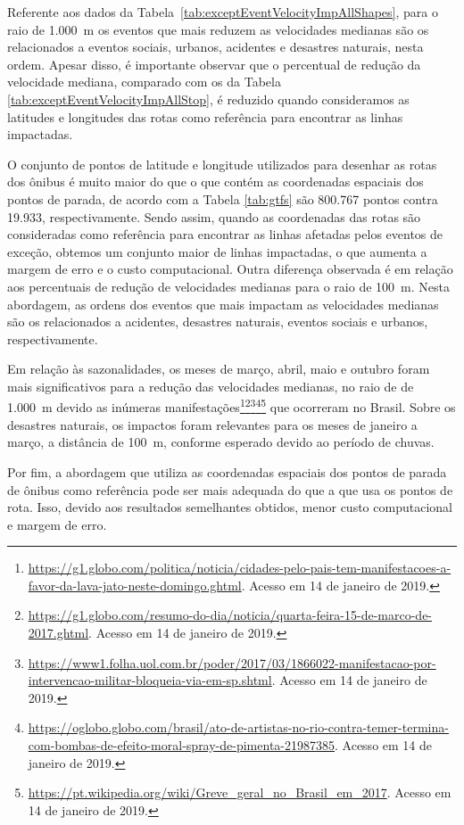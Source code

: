 \documentclass[
	12pt,				%
	oneside,			%
	a4paper,			%
	english,			%
	brazil				%
	]{abntex2ppgsi}
\begin{document}
{{{Referente aos dados da Tabela~\ref{tab:exceptEventVelocityImpAllShapes}, para o raio de 1.000~m os eventos que mais reduzem as velocidades medianas são os relacionados a eventos sociais, urbanos, acidentes e desastres naturais, nesta ordem. Apesar disso, é importante observar que o percentual de redução da velocidade mediana, comparado com os da Tabela \ref{tab:exceptEventVelocityImpAllStop}, é reduzido quando consideramos as latitudes e longitudes das rotas como referência para encontrar as linhas impactadas. 

O conjunto de pontos de latitude e longitude utilizados para desenhar as rotas dos ônibus é muito maior do que o que contém as coordenadas espaciais dos pontos de parada, de acordo com a Tabela \ref{tab:gtfs} são 800.767 pontos contra 19.933, respectivamente. Sendo assim, quando as coordenadas das rotas são consideradas como referência para encontrar as linhas afetadas pelos eventos de exceção, obtemos um conjunto maior de linhas impactadas, o que aumenta a margem de erro e o custo computacional. Outra diferença observada é em relação aos percentuais de redução de velocidades medianas para o raio de 100~m. Nesta abordagem, as ordens dos eventos que mais impactam as velocidades medianas são os relacionados a acidentes, desastres naturais, eventos sociais e urbanos, respectivamente.

Em relação às sazonalidades, os meses de  março, abril, maio e outubro foram mais significativos para a redução das velocidades medianas, no raio de de 1.000~m devido as inúmeras manifestações\footnote{\url{https://g1.globo.com/politica/noticia/cidades-pelo-pais-tem-manifestacoes-a-favor-da-lava-jato-neste-domingo.ghtml}. Acesso em 14 de janeiro de 2019.}\footnote{\url{https://g1.globo.com/resumo-do-dia/noticia/quarta-feira-15-de-marco-de-2017.ghtml}. Acesso em 14 de janeiro de 2019.}\footnote{\url{https://www1.folha.uol.com.br/poder/2017/03/1866022-manifestacao-por-intervencao-militar-bloqueia-via-em-sp.shtml}. Acesso em 14 de janeiro de 2019.}\footnote{\url{https://oglobo.globo.com/brasil/ato-de-artistas-no-rio-contra-temer-termina-com-bombas-de-efeito-moral-spray-de-pimenta-21987385}. Acesso em 14 de janeiro de 2019.}\footnote{\url{https://pt.wikipedia.org/wiki/Greve\_geral\_no\_Brasil\_em\_2017}. Acesso em 14 de janeiro de 2019.} que ocorreram no Brasil. Sobre os desastres naturais, os impactos foram relevantes para os meses de janeiro a março, a distância de 100~m, conforme esperado devido ao período de chuvas.

Por fim, a abordagem que utiliza as coordenadas espaciais dos pontos de parada de ônibus como referência pode ser mais adequada do que a que usa os pontos de rota. Isso, devido aos resultados semelhantes obtidos, menor custo computacional e margem de erro. 

}}}
\end{document}
